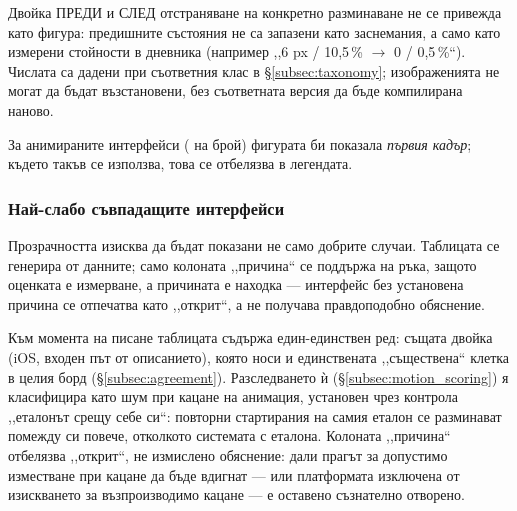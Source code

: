 



Двойка ПРЕДИ и СЛЕД отстраняване на конкретно разминаване не се привежда като фигура: предишните
състояния не са запазени като заснемания, а само като измерени стойности в дневника (например
,,6 px / 10,5\,\% $\rightarrow$ 0 / 0,5\,\%“). Числата са дадени при съответния клас в
§\ref{subsec:taxonomy}; изображенията не могат да бъдат възстановени, без съответната версия да
бъде компилирана наново.

За анимираните интерфейси (\gifPageCount{} на брой) фигурата би показала \emph{първия кадър};
където такъв се използва, това се отбелязва в легендата.

\subsubsection{Най-слабо съвпадащите интерфейси}

Прозрачността изисква да бъдат показани не само добрите случаи. Таблицата се генерира от данните;
само колоната ,,причина“ се поддържа на ръка, защото оценката е измерване, а причината е находка
--- интерфейс без установена причина се отпечатва като ,,открит“, а не получава правдоподобно
обяснение.



Към момента на писане таблицата съдържа един-единствен ред: същата двойка (iOS, входен път от
описанието), която носи и единствената ,,съществена“ клетка в целия борд (§\ref{subsec:agreement}).
Разследването ѝ (§\ref{subsec:motion_scoring}) я класифицира като шум при кацане на анимация,
установен чрез контрола ,,еталонът срещу себе си“: повторни стартирания на самия еталон се
разминават помежду си повече, отколкото системата с еталона. Колоната ,,причина“ отбелязва
,,открит“, не измислено обяснение: дали прагът за допустимо изместване при кацане да бъде вдигнат
--- или платформата изключена от изискването за възпроизводимо кацане --- е оставено съзнателно
отворено.

